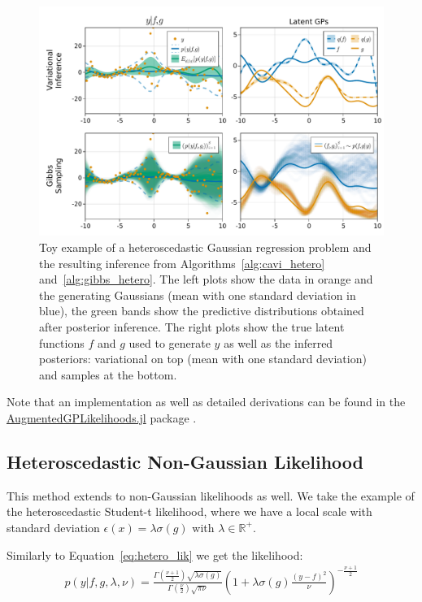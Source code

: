 \begin{figure}
\includegraphics[width=\textwidth]{./chapters/8_discussions/figures/heteroscedastic.pdf}
\caption{Toy example of a heteroscedastic Gaussian regression problem and the resulting inference from Algorithms~\ref{alg:cavi_hetero} and~\ref{alg:gibbs_hetero}.
The left plots show the data in orange and the generating Gaussians (mean with one standard deviation in blue), the green bands show the predictive distributions obtained after posterior inference.
The right plots show the true latent functions $f$ and $g$ used to generate $y$ as well as the inferred posteriors: variational on top (mean with one standard deviation) and samples at the bottom.}
\label{fig:heteroscedastic}
\end{figure}

Note that an implementation as well as detailed derivations can be found in the \href{https://github.com/JuliaGaussianProcesses/AugmentedGPLikelihoods.jl}{AugmentedGPLikelihoods.jl} package \cite{theo_galy_fajou_2022_6347022}.

\subsection{Heteroscedastic Non-Gaussian Likelihood}

This method extends to non-Gaussian likelihoods as well.
We take the example of the heteroscedastic Student-t likelihood, where we have a local scale with standard deviation $\epsilon(x) = \lambda \sigma(g)$ with $\lambda \in \mathbb{R}^+$.

Similarly to Equation~\eqref{eq:hetero_lik} we get the likelihood:
\begin{align*}
    p(y|f,g,\lambda,\nu) = \frac{\Gamma(\frac{\nu+1}{2})\sqrt{\lambda\sigma(g)}}{\Gamma(\frac{\nu}{2})\sqrt{\pi\nu}}\left(1 + \lambda \sigma(g)\frac{(y-f)^2}{\nu}\right)^{-\frac{\nu+1}{2}}
    \label{eq:hetero_studentt}
\end{align*}

